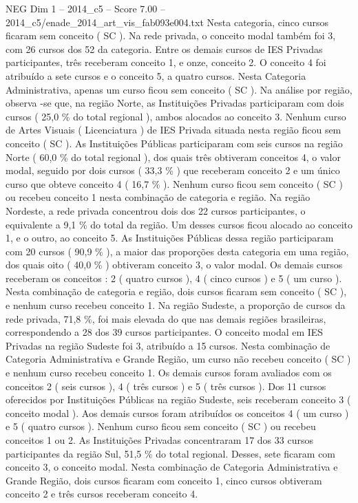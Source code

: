 \begin{textsample}{NEG Dim 1 – 2014\_c5 – Score 7.00 – 2014\_c5/enade\_2014\_art\_vis\_fab093e004.txt}
Nesta categoria, cinco cursos ficaram sem conceito ( SC ).
Na rede privada, o conceito modal também foi 3, com 26 cursos dos 52 da categoria.
Entre os demais cursos de IES Privadas participantes, três receberam conceito 1, e onze, conceito 2.
O conceito 4 foi atribuído a sete cursos e o conceito 5, a quatro cursos.
Nesta Categoria Administrativa, apenas um curso ficou sem conceito ( SC ).
Na análise por região, observa -se que, na região Norte, as Instituições Privadas participaram com dois cursos ( 25,0 \% do total regional ), ambos alocados ao conceito 3.
Nenhum curso de Artes Visuais ( Licenciatura ) de IES Privada situada nesta região ficou sem conceito ( SC ).
As Instituições Públicas participaram com seis cursos na região Norte ( 60,0 \% do total regional ), dos quais três obtiveram conceitos 4, o valor modal, seguido por dois cursos ( 33,3 \% ) que receberam conceito 2 e um único curso que obteve conceito 4 ( 16,7 \% ).
Nenhum curso ficou sem conceito ( SC ) ou recebeu conceito 1 nesta combinação de categoria e região.
Na região Nordeste, a rede privada concentrou dois dos 22 cursos participantes, o equivalente a 9,1 \% do total da região.
Um desses cursos ficou alocado ao conceito 1, e o outro, ao conceito 5.
As Instituições Públicas dessa região participaram com 20 cursos ( 90,9 \% ), a maior das proporções desta categoria em uma região, dos quais oito ( 40,0 \% ) obtiveram conceito 3, o valor modal.
Os demais cursos receberam os conceitos : 2 ( quatro cursos ), 4 ( cinco cursos ) e 5 ( um curso ).
Nesta combinação de categoria e região, dois cursos ficaram sem conceito ( SC ), e nenhum curso recebeu conceito 1.
Na região Sudeste, a proporção de cursos da rede privada, 71,8 \%, foi mais elevada do que nas demais regiões brasileiras, correspondendo a 28 dos 39 cursos participantes.
O conceito modal em IES Privadas na região Sudeste foi 3, atribuído a 15 cursos.
Nesta combinação de Categoria Administrativa e Grande Região, um curso não recebeu conceito ( SC ) e nenhum curso recebeu conceito 1.
Os demais cursos foram avaliados com os conceitos 2 ( seis cursos ), 4 ( três cursos ) e 5 ( três cursos ).
Dos 11 cursos oferecidos por Instituições Públicas na região Sudeste, seis receberam conceito 3 ( conceito modal ).
Aos demais cursos foram atribuídos os conceitos 4 ( um curso ) e 5 ( quatro cursos ).
Nenhum curso ficou sem conceito ( SC ) ou recebeu conceitos 1 ou 2.
As Instituições Privadas concentraram 17 dos 33 cursos participantes da região Sul, 51,5 \% do total regional.
Desses, sete ficaram com conceito 3, o conceito modal.
Nesta combinação de Categoria Administrativa e Grande Região, dois cursos ficaram com conceito 1, cinco cursos obtiveram conceito 2 e três cursos receberam conceito 4.

\end{textsample}
